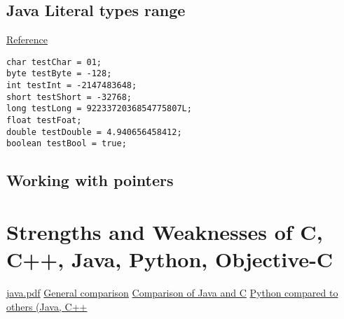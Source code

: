 \documentclass[letterpaper]{article}
\begin{document}
\subsection{Java Literal types range}
\href{http://www.jchq.net/certkey/0406certkey.htm}{Reference}
\begin{lstlisting}
char testChar = 01;
byte testByte = -128;
int testInt = -2147483648;
short testShort = -32768;
long testLong = 9223372036854775807L;
float testFoat;
double testDouble = 4.940656458412;
boolean testBool = true;
\end{lstlisting}
\subsection{Working with pointers}

\section{Strengths and Weaknesses of C, C++, Java, Python, Objective-C}
\href{https://files.nyu.edu/ahl266/public/java.pdf}{java.pdf}
\href{http://introcs.cs.princeton.edu/java/faq/c2java.html}{General comparison}
\href{http://en.wikipedia.org/wiki/Comparison_of_Java_and_C}{Comparison of Java and C} 
\href{http://www.python.org/doc/essays/comparisons.html}{Python compared to others (Java, C++}
\end{document}
